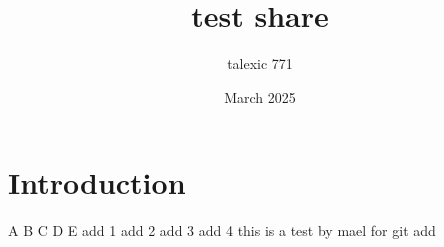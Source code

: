 \documentclass{article}
\title{test share}
\author{talexic 771 }
\date{March 2025}
\begin{document}
\maketitle

\section{Introduction}
A
B
C
D
E
add 1
add 2
add 3
add 4
this is a test by mael for git
add
\end{document}
